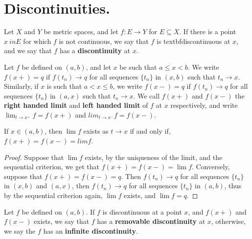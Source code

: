 
\section{Discontinuities.}

\begin{definition}
    Let $X$ and  $Y$ be metric spaces, and let  $f:E \rightarrow Y$ for $E \subseteq X$. 
    If there is a point $x\ in E$ for which  $f$ is not continuous, we say that  $f$ is 
    textbf{discontinuous} at $x$, and we say that  $f$ has a \textbf{discontinuity} at 
    $x$.
\end{definition}

\begin{definition}
    Let $f$ be defined on  $(a,b)$, and let  $x$ be such that  $a \leq x<b$. We write 
    $f(x+)=q$ if $f(t_n) \rightarrow q$ for all sequences  $\{t_n\}$ in  $(x,b)$ such that
    $t_n \rightarrow x$. Similarly, if  $x$ is such that  $a<x \leq b$, we write  $f(x-)=q$ if 
    $f(t_n) \rightarrow q$ for all  sequences $\{t_n\}$ in  $(a,x)$ such that $t_n \rightarrow x$. 
    We call  $f(x+)$ and  $f(x-)$ the \textbf{right handed limit} and \textbf{left handed limit} of  $f$ 
    at  $x$ respectively, and write  $\lim_{t \rightarrow x^+}{f}=f(x+)$ and  $lim_{t \rightarrow x^-}{f}=f(x-)$. 
\end{definition}

\begin{theorem}\label{5.5.1}
    If $x \in (a,b)$, then $\lim{f}$ exists as $t \rightarrow x$ if and only if, 
    $f(x+)=f(x-)=lim{f}$.
\end{theorem}
\begin{proof}
    Suppose that $\lim{f}$ exists, by the uniqueness of the limit, and the sequential criterion, 
    we get that $f(x+)=f(x-)=\lim{f}$. Conversely, suppose that  $f(x+)=f(x-)=q$. Then 
    $f(t_n) \rightarrow q$ for all sequences $\{t_n\}$ in $(x,b)$ and $(a,x)$, then  $f(t_n) \rightarrow q$ 
    for all sequences  $\{t_n\}$ in  $(a,b)$, thus by the sequential criterion again, $\lim{f}$ 
    exists, and $\lim{f}=q$.
\end{proof}

\begin{definition}
    Let $f$ be defined on  $(a,b)$. If  $f$ is discontinuous at a point  $x$, and 
    $f(x+)$ and  $f(x-)$ exists, we say that  $f$ has a \textbf{removable discontinuity} at  $x$, 
    otherwise, we say the  $f$ has an \textbf{infinite discontinuity}.
\end{definition}

